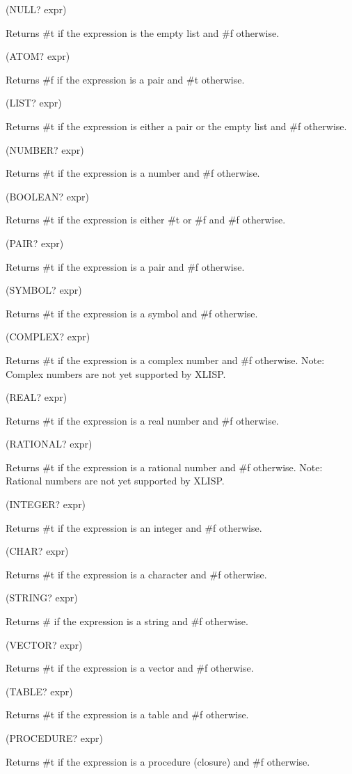 \documentclass[11pt]{article}
\begin{document}
(NULL? expr)

Returns \#t if the expression is the empty list and \#f otherwise.

(ATOM? expr)

Returns \#f if the expression is a pair and \#t otherwise.

(LIST? expr)

Returns \#t if the expression is either a pair or the empty list and \#f
otherwise.

(NUMBER? expr)

Returns \#t if the expression is a number and \#f otherwise.

(BOOLEAN? expr)

Returns \#t if the expression is either \#t or \#f and \#f otherwise.

(PAIR? expr)

Returns \#t if the expression is a pair and \#f otherwise.

(SYMBOL? expr)

Returns \#t if the expression is a symbol and \#f otherwise.

(COMPLEX? expr)

Returns \#t if the expression is a complex number and \#f otherwise. Note:
Complex numbers are not yet supported by XLISP.

(REAL? expr)

Returns \#t if the expression is a real number and \#f otherwise.

(RATIONAL? expr)

Returns \#t if the expression is a rational number and \#f
otherwise. Note: Rational numbers are not yet supported by XLISP.

(INTEGER? expr)

Returns \#t if the expression is an integer and \#f otherwise.

(CHAR? expr)

Returns \#t if the expression is a character and \#f otherwise.

(STRING? expr)

Returns \# if the expression is a string and \#f otherwise.

(VECTOR? expr)

Returns \#t if the expression is a vector and \#f otherwise.

(TABLE? expr)

Returns \#t if the expression is a table and \#f otherwise.

(PROCEDURE? expr)

Returns \#t if the expression is a procedure (closure) and \#f otherwise.
\end{document}
